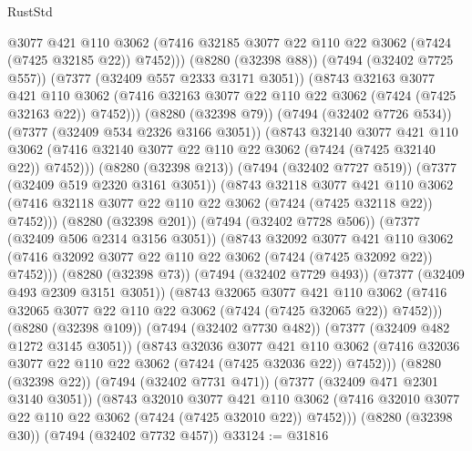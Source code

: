 \begin{lexlean}{RustStd}
\begin{coremodule}
                      @3077
                      @421
                      @110
                      @3062
                      (@7416 @32185 @3077 @22 @110 @22 @3062 (@7424 (@7425 @32185 @22)) @7452)))
                  (@8280 (@32398 @88))
                  (@7494 (@32402 @7725 @557))
                  (@7377 (@32409 @557 @2333 @3171 @3051))
                  (@8743
                    @32163
                    @3077
                    @421
                    @110
                    @3062
                    (@7416 @32163 @3077 @22 @110 @22 @3062 (@7424 (@7425 @32163 @22)) @7452)))
                (@8280 (@32398 @79))
                (@7494 (@32402 @7726 @534))
                (@7377 (@32409 @534 @2326 @3166 @3051))
                (@8743
                  @32140
                  @3077
                  @421
                  @110
                  @3062
                  (@7416 @32140 @3077 @22 @110 @22 @3062 (@7424 (@7425 @32140 @22)) @7452)))
              (@8280 (@32398 @213))
              (@7494 (@32402 @7727 @519))
              (@7377 (@32409 @519 @2320 @3161 @3051))
              (@8743
                @32118
                @3077
                @421
                @110
                @3062
                (@7416 @32118 @3077 @22 @110 @22 @3062 (@7424 (@7425 @32118 @22)) @7452)))
            (@8280 (@32398 @201))
            (@7494 (@32402 @7728 @506))
            (@7377 (@32409 @506 @2314 @3156 @3051))
            (@8743
              @32092
              @3077
              @421
              @110
              @3062
              (@7416 @32092 @3077 @22 @110 @22 @3062 (@7424 (@7425 @32092 @22)) @7452)))
          (@8280 (@32398 @73))
          (@7494 (@32402 @7729 @493))
          (@7377 (@32409 @493 @2309 @3151 @3051))
          (@8743
            @32065
            @3077
            @421
            @110
            @3062
            (@7416 @32065 @3077 @22 @110 @22 @3062 (@7424 (@7425 @32065 @22)) @7452)))
        (@8280 (@32398 @109))
        (@7494 (@32402 @7730 @482))
        (@7377 (@32409 @482 @1272 @3145 @3051))
        (@8743
          @32036
          @3077
          @421
          @110
          @3062
          (@7416 @32036 @3077 @22 @110 @22 @3062 (@7424 (@7425 @32036 @22)) @7452)))
      (@8280 (@32398 @22))
      (@7494 (@32402 @7731 @471))
      (@7377 (@32409 @471 @2301 @3140 @3051))
      (@8743
        @32010
        @3077
        @421
        @110
        @3062
        (@7416 @32010 @3077 @22 @110 @22 @3062 (@7424 (@7425 @32010 @22)) @7452)))
    (@8280 (@32398 @30))
    (@7494 (@32402 @7732 @457))
@33124 := @31816

\end{coremodule}
\end{lexlean}
